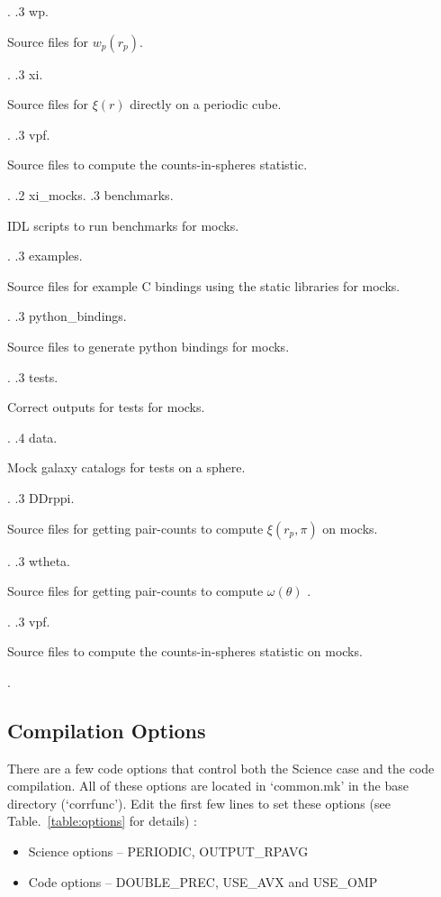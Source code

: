 \documentclass[12pt,titlepage]{article}
\newcommand\DotFill{\leavevmode\xleaders\hbox{.}\hfill\kern0pt}
\begin{document}
{\begin{minipage}[t]{8cm}
  \end{minipage}.
.3 wp\DotFill 
  \begin{minipage}[t]{8cm}
    Source files for $w_p(r_p)${.} 
  \end{minipage}.
.3 xi\DotFill 
  \begin{minipage}[t]{8cm}
    Source files for $\xi(r)$ directly on a periodic cube{.} 
  \end{minipage}.
.3 vpf\DotFill 
  \begin{minipage}[t]{8cm}
    Source files to compute the counts-in-spheres statistic{.} 
  \end{minipage}.
.2 xi\_mocks.
.3 benchmarks\DotFill
  \begin{minipage}[t]{8cm}
    IDL scripts to run benchmarks for mocks{.} 
  \end{minipage}.
.3 examples\DotFill 
  \begin{minipage}[t]{8cm}
    Source files for example C bindings using the static libraries for mocks{.} 
  \end{minipage}.
.3 python\_bindings\DotFill 
  \begin{minipage}[t]{8cm}
    Source files to generate python bindings for mocks{.} 
  \end{minipage}.
.3 tests\DotFill 
  \begin{minipage}[t]{8cm}
    Correct outputs for tests for mocks{.}
  \end{minipage}.
.4 data\DotFill 
  \begin{minipage}[t]{8cm}
    Mock galaxy catalogs for tests on a sphere{.} 
  \end{minipage}.
.3 DDrppi\DotFill 
  \begin{minipage}[t]{8cm}
    Source files for getting pair-counts to compute $\xi(r_p,\pi)$ on mocks{.} 
  \end{minipage}.
.3 wtheta\DotFill 
  \begin{minipage}[t]{8cm}
    Source files for getting pair-counts to compute $\omega(\theta)$ {.} 
  \end{minipage}.
.3 vpf\DotFill 
  \begin{minipage}[t]{8cm}
    Source files to compute the counts-in-spheres statistic on mocks{.} 
  \end{minipage}.
}

\subsection{Compilation Options}
There are a few code options that control both the Science case and the code compilation. All of these 
options are located in `common.mk' in the base directory (`corrfunc'). Edit the first few lines to set these 
options (see Table.~\ref{table:options} for details) :
\begin{itemize}
\item Science options -- PERIODIC, OUTPUT\_RPAVG
\item Code options -- DOUBLE\_PREC, USE\_AVX and USE\_OMP
\end{itemize}
\end{document}
